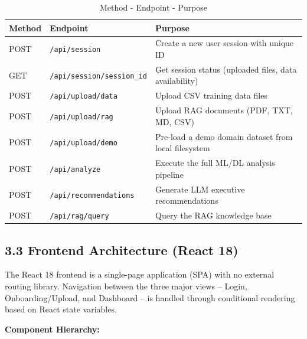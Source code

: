 \documentclass[12pt, a4paper]{report}
\begin{document}
\begin{table}[H]
\centering
\caption{Method - Endpoint - Purpose}
\vspace{0.1in}
\begin{tabularx}{\textwidth}{|>{\raggedright\arraybackslash}X|>{\raggedright\arraybackslash}X|>{\raggedright\arraybackslash}X|}
\hline
Method & Endpoint & Purpose \\ \hline
\hline
POST & \texttt{/api/session} & Create a new user session with unique ID \\ \hline
GET & \texttt{/api/session/{session\_id}} & Get session status (uploaded files, data availability) \\ \hline
POST & \texttt{/api/upload/data} & Upload CSV training data files \\ \hline
POST & \texttt{/api/upload/rag} & Upload RAG documents (PDF, TXT, MD, CSV) \\ \hline
POST & \texttt{/api/upload/demo} & Pre-load a demo domain dataset from local filesystem \\ \hline
POST & \texttt{/api/analyze} & Execute the full ML/DL analysis pipeline \\ \hline
POST & \texttt{/api/recommendations} & Generate LLM executive recommendations \\ \hline
POST & \texttt{/api/rag/query} & Query the RAG knowledge base \\ \hline
\end{tabularx}
\end{table}


\subsection{3.3 Frontend Architecture (React 18)}

The React 18 frontend is a single-page application (SPA) with no external routing library. Navigation between the three major views -- Login, Onboarding/Upload, and Dashboard -- is handled through conditional rendering based on React state variables.

\textbf{Component Hierarchy:}
\end{document}
